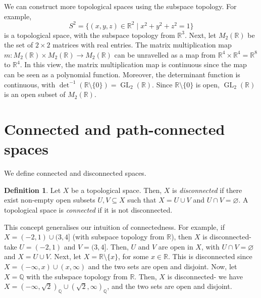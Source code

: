 \documentclass[a4paper, openany]{memoir}
\theoremstyle{definition}
\newtheorem{definition}{Definition}[section]
\theoremstyle{plain}
\begin{document}
We can construct more topological spaces using the subspace topology. For example, 
\[S^2 = \{(x, y, z) \in \mathbb{R}^2 \mid x^2 + y^2 + z^2 = 1\}\]
is a topological space, with the subspace topology from $\mathbb{R}^3$. Next, let $M_2(\mathbb{R})$ be the set of $2 \times 2$ matrices with real entries. The matrix multiplication map $m: M_2(\mathbb{R}) \times M_2(\mathbb{R}) \to M_2(\mathbb{R})$ can be unravelled as a map from $\mathbb{R}^4 \times \mathbb{R}^4 = \mathbb{R}^8$ to $\mathbb{R}^4$. In this view, the matrix multiplication map is continuous since the map can be seen as a polynomial function. Moreover, the determinant function is continuous, with $\det^{-1}(\mathbb{R} \setminus \{0\}) = \operatorname{GL}_2(\mathbb{R})$. Since $\mathbb{R} \setminus \{0\}$ is open, $\operatorname{GL}_2(\mathbb{R})$ is an open subset of $M_2(\mathbb{R})$.
\newpage

\section{Connected and path-connected spaces}
We define connected and disconnected spaces.
\begin{definition}
Let $X$ be a topological space. Then, $X$ is \emph{disconnected} if there exist non-empty open subsets $U, V \subseteq X$ such that $X = U \cup V$ and $U \cap V = \varnothing$. A topological space is \emph{connected} if it is not disconnected.
\end{definition}
\noindent This concept generalises our intuition of connectedness. For example, if $X = (-2, 1) \cup (3, 4]$ (with subspace topology from $\mathbb{R}$), then $X$ is disconnected- take $U = (-2, 1)$ and $V = (3, 4]$. Then, $U$ and $V$ are open in $X$, with $U \cap V = \varnothing$ and $X = U \cup V$. Next, let $X = \mathbb{R} \setminus \{x\}$, for some $x \in \mathbb{R}$. This is disconnected since $X = (-\infty, x) \cup (x, \infty)$ and the two sets are open and disjoint. Now, let $X = \mathbb{Q}$ with the subspace topology from $\mathbb{R}$. Then, $X$ is disconnected- we have $X = (-\infty, \sqrt{2})_{\mathbb{Q}} \cup (\sqrt{2}, \infty)_{\mathbb{Q}}$, and the two sets are open and disjoint. 
\end{document}
